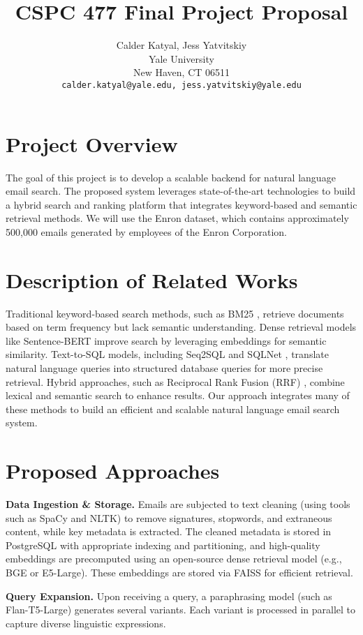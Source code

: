 \documentclass{article}
\title{CSPC 477 Final Project Proposal}
\author{%
  Calder Katyal, Jess Yatvitskiy\\
  Yale University\\
  New Haven, CT 06511 \\
  \texttt{calder.katyal@yale.edu, jess.yatvitskiy@yale.edu} \\
}
\begin{document}
\maketitle
\vspace{-2em}
\section{Project Overview}
\label{project_overview}

The goal of this project is to develop a scalable backend for natural language email search. The proposed system leverages state-of-the-art technologies to build a hybrid search and ranking platform that integrates keyword-based and semantic retrieval methods. We will use the Enron dataset, which contains approximately 500,000 emails generated by employees of the Enron Corporation.
\section{Description of Related Works}
\label{related_works}
Traditional keyword-based search methods, such as BM25 \citep{bm25}, retrieve documents based on term frequency but lack semantic understanding. Dense retrieval models like Sentence-BERT \citep{sentencebert} improve search by leveraging embeddings for semantic similarity. Text-to-SQL models, including Seq2SQL \citep{seq2sql} and SQLNet \citep{sqlnet}, translate natural language queries into structured database queries for more precise retrieval. Hybrid approaches, such as Reciprocal Rank Fusion (RRF) \citep{rrf}, combine lexical and semantic search to enhance results. Our approach integrates many of these methods to build an efficient and scalable natural language email search system.
\section{Proposed Approaches}

\textbf{Data Ingestion \& Storage.} Emails are subjected to text cleaning (using tools such as SpaCy and NLTK) to remove signatures, stopwords, and extraneous content, while key metadata is extracted. The cleaned metadata is stored in PostgreSQL with appropriate indexing and partitioning, and high-quality embeddings are precomputed using an open-source dense retrieval model (e.g., BGE or E5-Large). These embeddings are stored via FAISS for efficient retrieval.

\textbf{Query Expansion.} Upon receiving a query, a paraphrasing model (such as Flan-T5-Large) generates several variants. Each variant is processed in parallel to capture diverse linguistic expressions.
\end{document}
